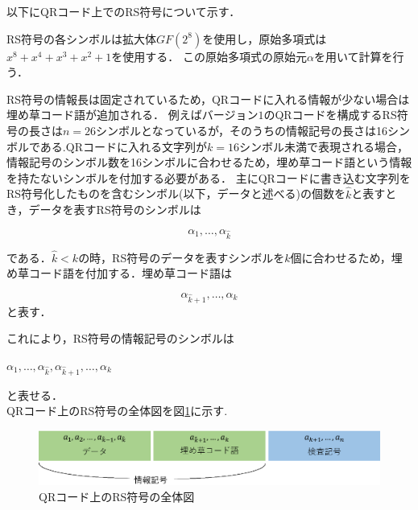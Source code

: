 \documentclass{thesis}
\begin{document}
以下にQRコード上でのRS符号について示す．

RS符号の各シンボルは拡大体$GF(2^8)$を使用し，原始多項式は
$x^{8}+x^{4}+x^{3}+x^{2}+1$を使用する．
この原始多項式の原始元$\alpha$を用いて計算を行う．

RS符号の情報長は固定されているため，QRコードに入れる情報が少ない場合は埋め草コード語が追加される．
例えばバージョン$1$のQRコードを構成するRS符号の長さは$n=26$シンボルとなっているが，そのうちの情報記号の長さは16シンボルである.QRコードに入れる文字列が$k=16$シンボル未満で表現される場合，情報記号のシンボル数を16シンボルに合わせるため，埋め草コード語という情報を持たないシンボルを付加する必要がある．
主にQRコードに書き込む文字列をRS符号化したものを含むシンボル(以下，データと述べる)の個数を$\hat{k}$と表すとき，データを表すRS符号のシンボルは

\begin{equation}
\alpha_1,…,\alpha_{\hat{k}}
\label{eq:pol1}
\end{equation}

である．$\hat{k} < k$の時，RS符号のデータを表すシンボルを$k$個に合わせるため，埋め草コード語を付加する．埋め草コード語は
 
 \begin{equation}
 \alpha_{\hat{k} + 1},…,\alpha_{k}
\label{eq:pol3}
\end{equation}
と表す．


これにより，RS符号の情報記号のシンボルは

\begin{center}
$\alpha_1,…,\alpha_{\hat{k}},\alpha_{\hat{k}+1},…,\alpha_{k}$
\end{center}
と表せる．\\


QRコード上のRS符号の全体図を図\ref{RScode}に示す.

\begin{figure}[H]
 \centering
 \includegraphics[width=1\linewidth]{pic/RScode_Tahara.eps}
 \caption{QRコード上のRS符号の全体図\label{RScode}}
\end{figure}
\end{document}
